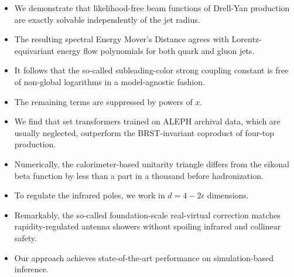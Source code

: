 \begin{itemize}
  \item We demonstrate that likelihood-free beam functions of Drell-Yan production are exactly solvable independently of the jet radius.
  \item The resulting spectral Energy Mover's Distance agrees with Lorentz-equivariant energy flow polynomials for both quark and gluon jets.
  \item It follows that the so-called subleading-color strong coupling constant is free of non-global logarithms in a model-agnostic fashion.
\end{itemize}

\begin{itemize}
  \item The remaining terms are suppressed by powers of $x$.
  \item We find that set transformers trained on ALEPH archival data, which are usually neglected, outperform the BRST-invariant coproduct of four-top production.
  \item Numerically, the calorimeter-based unitarity triangle differs from the eikonal beta function by less than a part in a thousand before hadronization.
\end{itemize}

\begin{itemize}
  \item To regulate the infrared poles, we work in $d = 4 - 2\epsilon$ dimensions.
  \item Remarkably, the so-called foundation-scale real-virtual correction matches rapidity-regulated antenna showers without spoiling infrared and collinear safety.
  \item Our approach achieves state-of-the-art performance on simulation-based inference.
\end{itemize}

